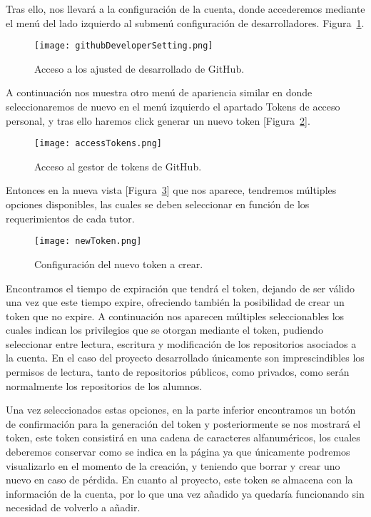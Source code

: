 Tras ello, nos llevará a la configuración de la cuenta, donde accederemos mediante el menú del lado izquierdo al submenú configuración de desarrolladores. Figura~\ref{figure:developerSettings}.

\begin{figure}[h!]
  \texttt{[image: githubDeveloperSetting.png]}
  \caption{Acceso a los ajusted de desarrollado de GitHub.}
  \label{figure:developerSettings}
\end{figure}

A continuación nos muestra otro menú de apariencia similar en donde seleccionaremos de nuevo en el menú izquierdo el apartado Tokens de acceso personal, y tras ello haremos click generar un nuevo token [Figura~\ref{figure:tokensGitHub}].

\begin{figure}[h!]
  \texttt{[image: accessTokens.png]}
  \caption{Acceso al gestor de tokens de GitHub.}
  \label{figure:tokensGitHub}
\end{figure}

Entonces en la nueva vista [Figura~\ref{figure:configToken}] que nos aparece, tendremos múltiples opciones disponibles, las cuales se deben seleccionar en función de los requerimientos de cada tutor.
\begin{figure}[h!]
  \texttt{[image: newToken.png]}
  \caption{Configuración del nuevo token a crear.}
  \label{figure:configToken}
\end{figure}

Encontramos el tiempo de expiración que tendrá el token, dejando de ser válido una vez que este tiempo expire, ofreciendo también la posibilidad de crear un token que no expire. A continuación nos aparecen múltiples seleccionables los cuales indican los privilegios que se otorgan mediante el token, pudiendo seleccionar entre lectura, escritura y modificación de los repositorios asociados a la cuenta. En el caso del proyecto desarrollado únicamente son imprescindibles los permisos de lectura, tanto de repositorios públicos, como privados, como serán normalmente los repositorios de los alumnos.

Una vez seleccionados estas opciones, en la parte inferior encontramos un botón de confirmación para la generación del token y posteriormente se nos mostrará el token, este token consistirá en una cadena de caracteres alfanuméricos, los cuales deberemos conservar como se indica en la página ya que únicamente podremos visualizarlo en el momento de la creación, y teniendo que borrar y crear uno nuevo en caso de pérdida. En cuanto al proyecto, este token se almacena con la información de la cuenta, por lo que una vez añadido ya quedaría funcionando sin necesidad de volverlo a añadir.

